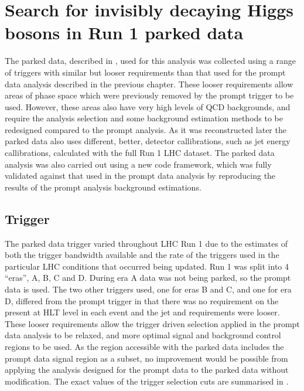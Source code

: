 \chapter{Search for invisibly decaying Higgs bosons in Run 1 parked data}
\label{chap:parked}
The parked data, described in , used for this analysis was collected using a range of triggers with similar but looser requirements than that used for the prompt data analysis described in the previous chapter. These looser requirements allow areas of phase space which were previously removed by the prompt trigger to be used. However, these areas also have very high levels of \ac{QCD} backgrounds, and require the analysis selection 
and some background estimation methods to be redesigned compared to the prompt analysis. As it was reconstructed later the parked data also uses different, better, detector callibrations, such as jet energy callibrations, calculated with the full Run 1 LHC dataset. The parked data analysis was also carried out using a new code framework, which was fully validated against that used in the prompt data analysis by reproducing the results of the prompt analysis background estimations. %


\section{Trigger}
\label{sec:parkedtrigger}
The parked data trigger varied throughout LHC Run 1 due to the estimates of both the trigger bandwidth available and the rate of the triggers used in the particular LHC conditions that occurred being updated. Run 1 was split into 4 ``eras'', A, B, C and D. During era A data was not being parked, so the prompt data is used. The two other triggers used, one for eras B and C, and one for era D, differed from the prompt trigger in that there was no requirement on the \MET present at \ac{HLT} level in each event and the jet \pt and \Mjj requirements were looser. These looser requirements allow the trigger driven selection applied in the prompt data analysis to be relaxed, and more optimal signal and background control regions to be used. As the region accessible with the parked data includes the prompt data signal region as a subset, no improvement would be possible from applying the analysis designed for the prompt data to the parked data without modification. The exact values of the trigger selection cuts are summarised in .

